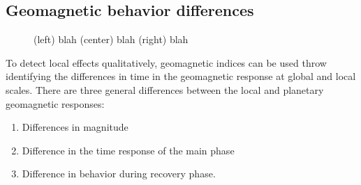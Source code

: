 \documentclass[a4paper, 11pt]{article}
\begin{document}
\subsection{Geomagnetic behavior differences}

\begin{figure}
    \centering
    \caption{(left) blah (center) blah (right) blah}
    \label{gse}
\end{figure}

To detect local effects qualitatively, geomagnetic indices can be used throw identifying the differences in time in the geomagnetic response at global and local scales. There are three general differences between the local and planetary geomagnetic responses:  

\begin{enumerate}
    \item     Differences in magnitude 
    \item     Difference in the time response of the main phase 
    \item     Difference in behavior during recovery phase. 
\end{enumerate}
\end{document}
